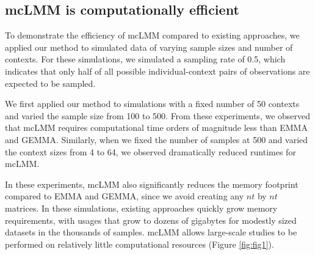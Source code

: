     \subsection{mcLMM is computationally efficient}
        To demonstrate the efficiency of mcLMM compared to existing approaches, we applied our method to simulated data of varying sample sizes and number of contexts. For these simulations, we simulated a sampling rate of 0.5, which indicates that only half of all possible individual-context pairs of observations are expected to be sampled. 
        
        We first applied our method to simulations with a fixed number of 50 contexts and varied the sample size from 100 to 500. From these experiments, we observed that mcLMM requires computational time orders of magnitude less than EMMA and GEMMA. Similarly, when we fixed the number of samples at 500 and varied the context sizes from 4 to 64, we observed dramatically reduced runtimes for mcLMM.
        
        In these experiments, mcLMM also significantly reduces the memory footprint compared to EMMA and GEMMA, since we avoid creating any $nt$ by $nt$ matrices. In these simulations, existing approaches quickly grow memory requirements, with usages that grow to dozens of gigabytes for modestly sized datasets in the thousands of samples. mcLMM allows large-scale studies to be performed on relatively little computational resources (Figure \ref{fig:fig1}). 
        
